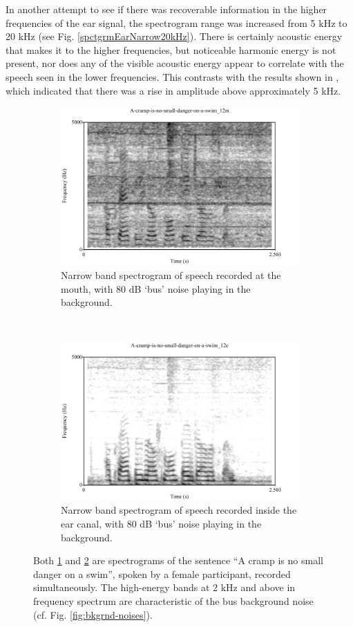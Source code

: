 In another attempt to see if there was recoverable information in the higher frequencies of the ear signal, the spectrogram range was increased from 5 kHz to 20 kHz (see Fig. \ref{spctgrmEarNarrow20kHz}). There is certainly acoustic energy that makes it to the higher frequencies, but noticeable harmonic energy is not present, nor does any of the visible acoustic energy appear to correlate with the speech seen in the lower frequencies.  This contrasts with the results shown in \cite{hansen:97b}, which indicated that there was a rise in amplitude above approximately 5 kHz.

\begin{figure}[H]
\centering
\begin{subfigure}{\textwidth}
  \centering
  \includegraphics[width=0.8\linewidth]{figure/spctgrmNarrowMthNoise_35.pdf}
  \caption{Narrow band spectrogram of speech recorded at the mouth, with 80 dB `bus' noise playing in the background.}
  \label{spctgrmNarrowMouthNoise_35}
\end{subfigure}%
\\[2ex]
\begin{subfigure}{\textwidth}
  \centering
  \includegraphics[width=0.8\linewidth]{figure/spctgrmNarrowEarNoise_35.pdf}
  \caption{Narrow band spectrogram of speech recorded inside the ear canal, with 80 dB `bus' noise playing in the background.}
  \label{spctgrmNarrowEarNoise_35}
\end{subfigure}
\caption{Both \ref{spctgrmNarrowMouthNoise_35} and \ref{spctgrmNarrowEarNoise_35} are spectrograms of the sentence ``A cramp is no small danger on a swim'', spoken by a female participant, recorded simultaneously.  The high-energy bands at 2 kHz and above in frequency spectrum are characteristic of the bus background noise (cf. Fig. \ref{fig:bkgrnd-noises}).}
\label{fig:noise_mth_ear}
\end{figure}

